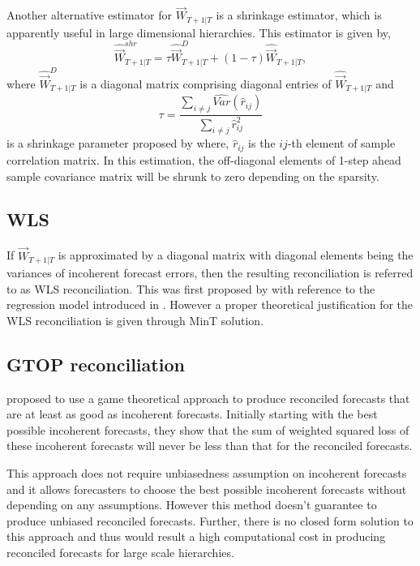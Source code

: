 \documentclass[graybox]{svmult}
\begin{document}
Another alternative estimator for ${\vec{W}}_{T+1|T}$ is a shrinkage estimator, which is apparently useful in large dimensional hierarchies. This estimator is given by,
\begin{equation} \label{eq:16}
\hat{{\vec{W}}}_{T+1|T}^{shr} = \tau\hat{{\vec{W}}}_{T+1|T}^D + (1-\tau)\hat{{\vec{W}}}_{T+1|T},
\end{equation}
where $\hat{{\vec{W}}}_{T+1|T}^D$ is a diagonal matrix comprising diagonal entries of $\hat{{\vec{W}}}_{T+1|T}$ and 
$$\tau = \frac{\sum_{i \ne j}\hat{Var}(\hat{r}_{ij})}{\sum_{i \ne j}\hat{r}_{ij}^2}$$ is a shrinkage parameter proposed by \citet{schafer2005} where, $\hat{r}_{ij}$ is the $ij$-th element of sample correlation matrix.  In this estimation, the off-diagonal elements of 1-step ahead sample covariance matrix will be shrunk to zero depending on the sparsity.

\subsection*{WLS}

If ${\vec{W}}_{T+1|T}$ is approximated by a diagonal matrix with diagonal elements being the variances of incoherent forecast errors, then the resulting reconciliation is referred to as WLS reconciliation. This was first proposed by \cite{Hyndman2016} with reference to the regression model introduced in \cite{hyndman2011}. However a proper theoretical justification for the WLS reconciliation is given through MinT solution.

\subsection{GTOP reconciliation}

\cite{VanErven2015a} proposed to use a game theoretical approach to produce reconciled forecasts that are at least as good as incoherent forecasts. Initially starting with the best possible incoherent forecasts, they show that the sum of weighted squared loss of these incoherent forecasts will never be less than that for the reconciled forecasts.

This approach does not require unbiasedness assumption on incoherent forecasts and it allows forecasters to choose the best possible incoherent forecasts without depending on any assumptions. However this method doesn't guarantee to produce unbiased reconciled forecasts. Further, there is no closed form solution to this approach and thus would result a high computational cost in producing reconciled forecasts for large scale hierarchies.\\ 
\end{document}

